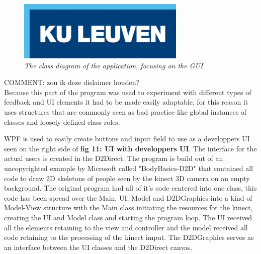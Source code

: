 \begin{figure}[H]
\begin{center}
\includegraphics[width=8cm]{KUL.png} %
\caption{\emph{The class diagram of the application, focusing on the GUI}}
\label{fig: gui_classdiagram}
\end{center}
\end{figure}

{\large COMMENT: zou ik deze dislaimer houden?} \\

Because this part of the program was used to experiment with different types of feedback and UI elements it had to be made easily adaptable, for this reason it uses structures that are commonly seen as bad practice like global instances of classes and loosely defined class roles.  

WPF is used to easily create buttons and input field to use as a developpers UI seen on the right side of \textbf{ fig 11: UI with developpers UI}. The interface for the actual users is created in the D2Direct. The program is build out of an uncopyrighted example by Microsoft called "BodyBasics-D2D" that contained all code to draw 2D skeletons of people seen by the kinect 3D camera on an empty background. The original program had all of it's code centered into one class, this code has been spread over the Main, UI, Model and D2D\textunderscore Graphics into a kind of Model-View structure with the Main class initiating the resources for the kinect, creating the UI and Model class and starting the program loop. The UI received all the elements retaining to the view and controller and the model received all code retaining to the processing of the kinect imput. The D2D\textunderscore Graphics  serves as an interface between the UI classes and the D2Direct canvas.


